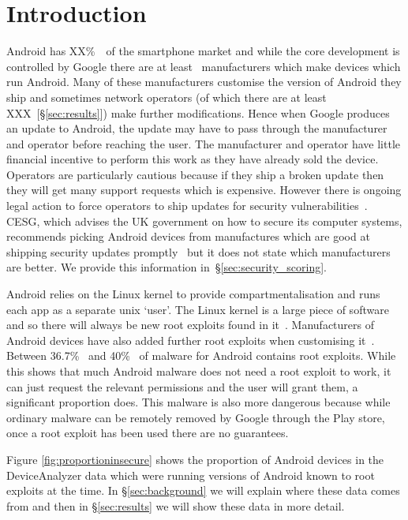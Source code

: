 \documentclass[conference,a4paper,twoside]{IEEEtran}
\newcommand{\percMarketShare}{XX\%~\cite{TODO}}
\newcommand{\daNumNetworkOperators}{XXX~[\S\ref{sec:results}]}
\begin{document}
\section{Introduction}
Android has \percMarketShare\ of the smartphone market and while the core development is controlled by Google there are at least \daNumManufacturers\ manufacturers which make devices which run Android.
Many of these manufacturers customise the version of Android they ship and sometimes network operators (of which there are at least \daNumNetworkOperators) make further modifications.
Hence when Google produces an update to Android, the update may have to pass through the manufacturer and operator before reaching the user.
The manufacturer and operator have little financial incentive to perform this work as they have already sold the device.
Operators are particularly cautious because if they ship a broken update then they will get many support requests which is expensive.
However there is ongoing legal action to force operators to ship updates for security vulnerabilities~\cite{Soghoian2013}.
CESG, which advises the UK government on how to secure its computer systems, recommends picking Android devices from manufactures which are good at shipping security updates promptly~\cite{CESG2013} but it does not state which manufacturers are better.
We provide this information in~\S\ref{sec:security_scoring}.

Android relies on the Linux kernel to provide compartmentalisation and runs each app as a separate unix `user'.
The Linux kernel is a large piece of software and so there will always be new root exploits found in it~\cite{TODO}.
Manufacturers of Android devices have also added further root exploits when customising it~\cite{Grace2012}.
Between 36.7\%~\cite{Zhou2012b} and 40\%~\cite{Zhou2012a} of malware for Android contains root exploits.
While this shows that much Android malware does not need a root exploit to work, it can just request the relevant permissions and the user will grant them, a significant proportion does.
This malware is also more dangerous because while ordinary malware can be remotely removed by Google through the Play store, once a root exploit has been used there are no guarantees.

Figure \ref{fig:proportioninsecure} shows the proportion of Android devices in the DeviceAnalyzer data which were running versions of Android known to root exploits at the time.
In \S\ref{sec:background} we will explain where these data comes from and then in \S\ref{sec:results} we will show these data in more detail.
\end{document}
